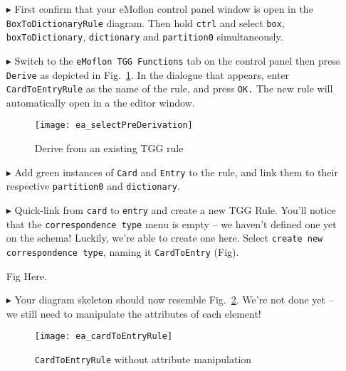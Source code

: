 \begin{enumerate}
  
\item[$\blacktriangleright$] First confirm that your eMoflon control panel window is open in the \texttt{Box\-To\-Dictionary\-Rule} diagram. Then hold
\texttt{ctrl} and select \texttt{box}, \texttt{boxToDictionary}, \texttt{dictionary} and \texttt{partition0} simultaneously.
  
\item[$\blacktriangleright$] Switch to the \texttt{eMoflon TGG Functions} tab on the control panel then press \texttt{Derive} as depicted in
Fig.~\ref{fig:derive_from_tgg_rule}. In the dialogue that appears, enter \texttt{CardToEntryRule} as the name of the rule, and press \texttt{OK.} The new rule
will automatically open in a the editor window.

\begin{figure}[htbp]
\begin{center}
 \texttt{[image: ea\_selectPreDerivation]}
  \caption{Derive from an existing TGG rule}
  \label{fig:derive_from_tgg_rule}
\end{center}
\end{figure}
\FloatBarrier

\item[$\blacktriangleright$] Add green instances of \texttt{Card} and \texttt{Entry} to the rule, and link them to their respective \texttt{partition0} and
\texttt{dictionary}. 

\item[$\blacktriangleright$] Quick-link from \texttt{card} to \texttt{entry} and create a new TGG Rule. You'll notice that the \texttt{correspondence type} menu
is empty -- we haven't defined one yet on the schema! Luckily, we're able to create one here. Select \texttt{create new correspondence type}, naming it
\texttt{CardToEntry} (Fig). 

Fig Here.

\item[$\blacktriangleright$] Your diagram skeleton should now resemble Fig.~\ref{fig:cardtoentry_1}. We're not done yet -- we still need to manipulate the
attributes of each element!

\vspace{0.5cm}

  \begin{figure}[htbp]
  \begin{center}
    \texttt{[image: ea\_cardToEntryRule]}
    \caption{\texttt{CardToEntryRule} without attribute manipulation}
    \label{fig:cardtoentry_1}
  \end{center}
  \end{figure}

\end{enumerate}


